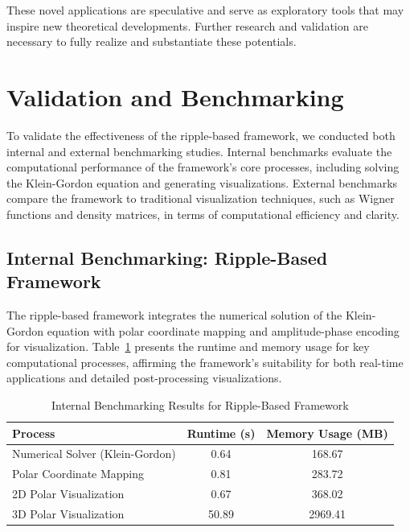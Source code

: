 \documentclass[12pt]{article}
\begin{document}
These novel applications are speculative and serve as exploratory tools that may inspire new theoretical developments. Further research and validation are necessary to fully realize and substantiate these potentials.

\section{Validation and Benchmarking}
\label{sec:validation_benchmarking}

To validate the effectiveness of the ripple-based framework, we conducted both internal and external benchmarking studies. Internal benchmarks evaluate the computational performance of the framework's core processes, including solving the Klein-Gordon equation and generating visualizations. External benchmarks compare the framework to traditional visualization techniques, such as Wigner functions and density matrices, in terms of computational efficiency and clarity.

\subsection{Internal Benchmarking: Ripple-Based Framework}

The ripple-based framework integrates the numerical solution of the Klein-Gordon equation with polar coordinate mapping and amplitude-phase encoding for visualization. Table~\ref{tab:benchmark_ripple} presents the runtime and memory usage for key computational processes, affirming the framework's suitability for both real-time applications and detailed post-processing visualizations.

\begin{table}[H]
\centering
\caption{Internal Benchmarking Results for Ripple-Based Framework}
\begin{tabular}{|l|c|c|}
    \hline
    \textbf{Process} & \textbf{Runtime (s)} & \textbf{Memory Usage (MB)} \\
    \hline
    Numerical Solver (Klein-Gordon) & 0.64 & 168.67 \\
    Polar Coordinate Mapping & 0.81 & 283.72 \\
    2D Polar Visualization & 0.67 & 368.02 \\
    3D Polar Visualization & 50.89 & 2969.41 \\
    \hline
\end{tabular}
\label{tab:benchmark_ripple}
\end{table}
\end{document}
